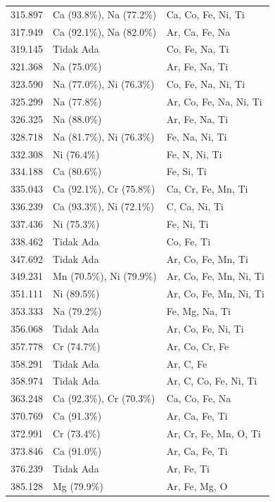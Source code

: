\begin{onehalfspace}
\begin{longtable}{p{}p{}p{}}
        315.897 & Ca (93.8\%), Na (77.2\%) & Ca, Co, Fe, Ni, Ti \\
        317.949 & Ca (92.1\%), Na (82.0\%) & Ar, Ca, Fe, Na \\
        319.145 & Tidak Ada & Co, Fe, Na, Ti \\
        321.368 & Na (75.0\%) & Ar, Fe, Na, Ti \\
        323.590 & Na (77.0\%), Ni (76.3\%) & Co, Fe, Na, Ni, Ti \\
        325.299 & Na (77.8\%) & Ar, Co, Fe, Na, Ni, Ti \\
        326.325 & Na (88.0\%) & Ar, Fe, Na, Ti \\
        328.718 & Na (81.7\%), Ni (76.3\%) & Fe, Na, Ni, Ti \\
        332.308 & Ni (76.4\%) & Fe, N, Ni, Ti \\
        334.188 & Ca (80.6\%) & Fe, Si, Ti \\
        335.043 & Ca (92.1\%), Cr (75.8\%) & Ca, Cr, Fe, Mn, Ti \\
        336.239 & Ca (93.3\%), Ni (72.1\%) & C, Ca, Ni, Ti \\
        337.436 & Ni (75.3\%) & Fe, Ni, Ti \\
        338.462 & Tidak Ada & Co, Fe, Ti \\
        347.692 & Tidak Ada & Ar, Co, Fe, Mn, Ti \\
        349.231 & Mn (70.5\%), Ni (79.9\%) & Ar, Co, Fe, Mn, Ni, Ti \\
        351.111 & Ni (89.5\%) & Ar, Co, Fe, Mn, Ni, Ti \\
        353.333 & Na (79.2\%) & Fe, Mg, Na, Ti \\
        356.068 & Tidak Ada & Ar, Co, Fe, Ni, Ti \\
        357.778 & Cr (74.7\%) & Ar, Co, Cr, Fe \\
        358.291 & Tidak Ada & Ar, C, Fe \\
        358.974 & Tidak Ada & Ar, C, Co, Fe, Ni, Ti \\
        363.248 & Ca (92.3\%), Cr (70.3\%) & Ca, Co, Fe, Na \\
        370.769 & Ca (91.3\%) & Ar, Ca, Fe, Ti \\
        372.991 & Cr (73.4\%) & Ar, Cr, Fe, Mn, O, Ti \\
        373.846 & Ca (91.0\%) & Ar, Ca, Fe, Ti \\
        376.239 & Tidak Ada & Ar, Fe, Ti \\
        385.128 & Mg (79.9\%) & Ar, Fe, Mg, O \\

\end{longtable}
\end{onehalfspace}

